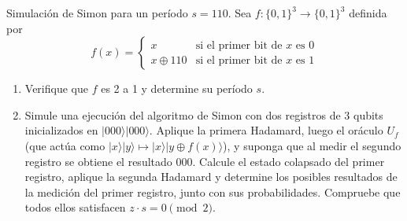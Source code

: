 {\bfseries

Simulación de Simon para un período $s=110$. Sea $f:\{0,1\}^3 \rightarrow \{0,1\}^3$ definida por
$$
f(x) = \begin{cases}
x & \text{si el primer bit de } x \text{ es } 0 \\
x \oplus 110 & \text{si el primer bit de } x \text{ es } 1
\end{cases}
$$
\begin{enumerate}
    \item[a)] Verifique que $f$ es 2 a 1 y determine su período $s$.
    \item[b)] Simule una ejecución del algoritmo de Simon con dos registros de 3 qubits inicializados en $\vert 000 \rangle \vert 000 \rangle$. Aplique la primera Hadamard, luego el oráculo $U_f$ (que actúa como $\vert x \rangle \vert y \rangle \mapsto \vert x \rangle \vert y \oplus f(x) \rangle$), y suponga que al medir el segundo registro se obtiene el resultado $000$. Calcule el estado colapsado del primer registro, aplique la segunda Hadamard y determine los posibles resultados de la medición del primer registro, junto con sus probabilidades. Compruebe que todos ellos satisfacen $z \cdot s = 0 \pmod 2$.
\end{enumerate}}
\vspace{.5cm}


